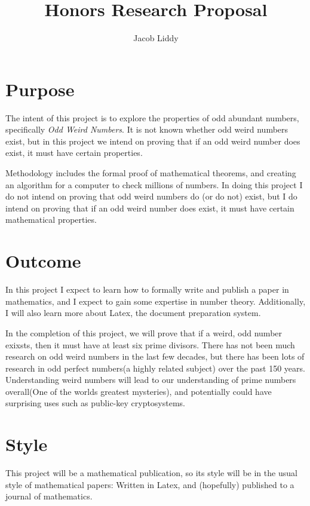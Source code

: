 \documentclass[12pt]{article}
\begin{document}
\title{Honors Research Proposal}
\author{Jacob Liddy}

\maketitle
\section{Purpose}
\quad
The intent of this project is to explore the properties of odd abundant numbers, specifically \textit{Odd Weird Numbers}. It is not known whether odd weird numbers exist, but in this project we intend on proving that if an odd weird number does exist, it must have certain properties.

Methodology includes the formal proof of mathematical theorems, and creating an algorithm for a computer to check millions of numbers. In doing this project I do not intend on proving that odd weird numbers do (or do not) exist, but I do intend on proving that if an odd weird number does exist, it must have certain mathematical properties. 

\section{Outcome}
\quad
In this project I expect to learn how to formally write and publish a paper in mathematics, and I expect to gain some expertise in number theory. Additionally, I will also learn more about Latex, the document preparation system. 

In the completion of this project, we will prove that if a weird, odd number exixsts, then it must have at least six prime divisors. There has not been much research on odd weird numbers in the last few decades, but there has been lots of research in odd perfect numbers(a highly related subject) over the past 150 years. Understanding weird numbers will lead to our understanding of prime numbers overall(One of the worlds greatest mysteries), and potentially could have surprising uses such as public-key cryptosystems.

\section{Style}
\quad
This project will be a mathematical publication, so its style will be in the usual style of mathematical papers: Written in Latex, and (hopefully) published to a journal of mathematics.
\end{document}
